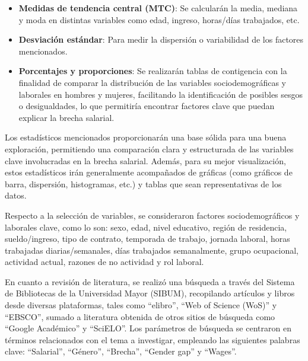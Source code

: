 \begin{itemize}
    \item \textbf{Medidas de tendencia central (MTC)}: Se calcularán la media, mediana y moda en distintas variables como edad, ingreso, horas/días trabajados, etc.
    \item \textbf{Desviación estándar}: Para medir la dispersión o variabilidad de los factores mencionados.
    \item \textbf{Porcentajes y proporciones}: Se realizarán tablas de contigencia con la finalidad de comparar la distribución de las variables sociodemográficas y laborales en hombres y mujeres, facilitando la identificación de posibles sesgos o desigualdades, lo que permitiría encontrar factores clave que puedan explicar la brecha salarial.
\end{itemize}

Los estadísticos mencionados proporcionarán una base sólida para una buena exploración, permitiendo una comparación clara y estructurada de las variables clave involucradas en la brecha salarial. Además, para su mejor visualización, estos estadísticos irán generalmente acompañados de gráficas (como gráficos de barra, dispersión, histogramas, etc.) y tablas que sean representativas de los datos.

Respecto a la selección de variables, se consideraron factores sociodemográficos y laborales clave, como lo son: sexo, edad, nivel educativo, región de residencia, sueldo/ingreso, tipo de contrato, temporada de trabajo, jornada laboral, horas trabajadas diarias/semanales, días trabajados semanalmente, grupo ocupacional, actividad actual, razones de no actividad y rol laboral.

En cuanto a revisión de literatura, se realizó una búsqueda a través del Sistema de Bibliotecas de la Universidad Mayor (SIBUM), recopilando artículos y libros desde diversas plataformas, tales como ``elibro'', ``Web of Science (WoS)'' y ``EBSCO'', sumado a literatura obtenida de otros sitios de búsqueda como ``Google Académico'' y ``SciELO''. Los parámetros de búsqueda se centraron en términos relacionados con el tema a investigar, empleando las siguientes palabras clave: ``Salarial'', ``Género'', ``Brecha'', ``Gender gap'' y ``Wages''. 



